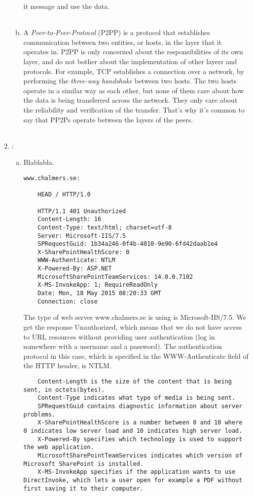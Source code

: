 \documentclass[a4paper,9pt,fleqn]{article}
\begin{document}
\begin{enumerate}[{Task} 1]
\begin{enumerate}[a)]
it message and use the data. 
\\
\\ 
\item 
A {\it Peer-to-Peer-Protocol} (P2PP) is a protocol that establishes communication
between two entities, or hosts, in the layer that it operates in. P2PP is
only concerned about the responsibilities of its own layer, and do not bother
about the implementation of other layers and protocols. For example, TCP
establishes a connection over a network, by performing the {\it three-way handshake}
between two hosts. The two hosts operate in a similar way as each other, but none
of them care about how the data is being transferred across the network. They only
care about the reliability and verification of the transfer. That's why it's common
to say that PP2Ps operate between the layers of the peers.
\\
\\
\end{enumerate}

\item :
\begin{enumerate}[a)]
\item
Blablabla.

\begin{lstlisting}
www.chalmers.se:

	HEAD / HTTP/1.0

	HTTP/1.1 401 Unauthorized
	Content-Length: 16
	Content-Type: text/html; charset=utf-8
	Server: Microsoft-IIS/7.5
	SPRequestGuid: 1b34a246-0f4b-4010-9e90-6fd42daab1e4
	X-SharePointHealthScore: 0
	WWW-Authenticate: NTLM
	X-Powered-By: ASP.NET
	MicrosoftSharePointTeamServices: 14.0.0.7102
	X-MS-InvokeApp: 1; RequireReadOnly
	Date: Mon, 18 May 2015 08:20:33 GMT
	Connection: close
\end{lstlisting}	

The type of web server {\outp www.chalmers.se} is using is {\outp Microsoft-IIS/7.5}.
We get the response { Unauthorized}, which means that we do not have access
to URL resources without providing user authentication (log in somewhere with
a username and a password). The authentication protocol in this case, which
is specified in the {\outp WWW-Authenticate} field of the HTTP header, is {\outp NTLM}.

\begin{lstlisting}
	Content-Length is the size of the content that is being sent, in octets(bytes).
	Content-Type indicates what type of media is being sent.
	SPRequestGuid contains diagnostic information about server problems.
	X-SharePointHealthScore is a number between 0 and 10 where 0 indicates low server load and 10 indicates high server load.
	X-Powered-By specifies which technology is used to support the web application.
	MicrosoftSharePointTeamServices indicates which version of Microsoft SharePoint is installed.
	X-MS-InvokeApp specifies if the application wants to use DirectInvoke, which lets a user open for example a PDF without first saving it to their computer. 
\end{lstlisting}


\end{enumerate}
\end{enumerate}
\end{document}
